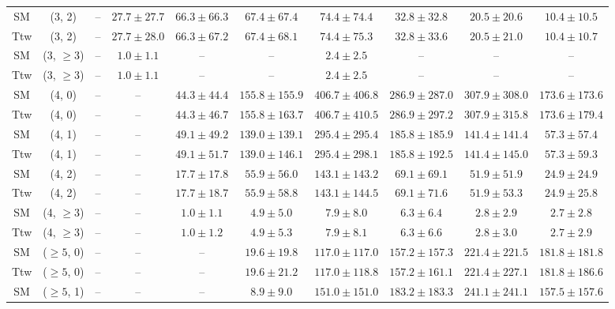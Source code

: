 \begin{table}[h!]
{\begin{tabular}{cccccccccc}
	SM & (3, 2) & -- & $27.7\pm 27.7$ & $66.3\pm 66.3$ & $67.4\pm 67.4$ & $74.4\pm 74.4$ & $32.8\pm 32.8$ & $20.5\pm 20.6$ & $10.4\pm 10.5$ \\[0.5ex] 
	Ttw & (3, 2) & -- & $27.7\pm 28.0$ & $66.3\pm 67.2$ & $67.4\pm 68.1$ & $74.4\pm 75.3$ & $32.8\pm 33.6$ & $20.5\pm 21.0$ & $10.4\pm 10.7$ \\[0.5ex] 
	SM & (3, $\ge3$) & -- & $1.0\pm 1.1$ & -- & -- & $2.4\pm 2.5$ & -- & -- & -- \\[0.5ex] 
	Ttw & (3, $\ge3$) & -- & $1.0\pm 1.1$ & -- & -- & $2.4\pm 2.5$ & -- & -- & -- \\[0.5ex] 
	SM & (4, 0) & -- & -- & $44.3\pm 44.4$ & $155.8\pm 155.9$ & $406.7\pm 406.8$ & $286.9\pm 287.0$ & $307.9\pm 308.0$ & $173.6\pm 173.6$ \\[0.5ex] 
	Ttw & (4, 0) & -- & -- & $44.3\pm 46.7$ & $155.8\pm 163.7$ & $406.7\pm 410.5$ & $286.9\pm 297.2$ & $307.9\pm 315.8$ & $173.6\pm 179.4$ \\[0.5ex] 
	SM & (4, 1) & -- & -- & $49.1\pm 49.2$ & $139.0\pm 139.1$ & $295.4\pm 295.4$ & $185.8\pm 185.9$ & $141.4\pm 141.4$ & $57.3\pm 57.4$ \\[0.5ex] 
	Ttw & (4, 1) & -- & -- & $49.1\pm 51.7$ & $139.0\pm 146.1$ & $295.4\pm 298.1$ & $185.8\pm 192.5$ & $141.4\pm 145.0$ & $57.3\pm 59.3$ \\[0.5ex] 
	SM & (4, 2) & -- & -- & $17.7\pm 17.8$ & $55.9\pm 56.0$ & $143.1\pm 143.2$ & $69.1\pm 69.1$ & $51.9\pm 51.9$ & $24.9\pm 24.9$ \\[0.5ex] 
	Ttw & (4, 2) & -- & -- & $17.7\pm 18.7$ & $55.9\pm 58.8$ & $143.1\pm 144.5$ & $69.1\pm 71.6$ & $51.9\pm 53.3$ & $24.9\pm 25.8$ \\[0.5ex] 
	SM & (4, $\ge3$) & -- & -- & $1.0\pm 1.1$ & $4.9\pm 5.0$ & $7.9\pm 8.0$ & $6.3\pm 6.4$ & $2.8\pm 2.9$ & $2.7\pm 2.8$ \\[0.5ex] 
	Ttw & (4, $\ge3$) & -- & -- & $1.0\pm 1.2$ & $4.9\pm 5.3$ & $7.9\pm 8.1$ & $6.3\pm 6.6$ & $2.8\pm 3.0$ & $2.7\pm 2.9$ \\[0.5ex] 
	SM & ($\ge5$, 0) & -- & -- & -- & $19.6\pm 19.8$ & $117.0\pm 117.0$ & $157.2\pm 157.3$ & $221.4\pm 221.5$ & $181.8\pm 181.8$ \\[0.5ex] 
	Ttw & ($\ge5$, 0) & -- & -- & -- & $19.6\pm 21.2$ & $117.0\pm 118.8$ & $157.2\pm 161.1$ & $221.4\pm 227.1$ & $181.8\pm 186.6$ \\[0.5ex] 
	SM & ($\ge5$, 1) & -- & -- & -- & $8.9\pm 9.0$ & $151.0\pm 151.0$ & $183.2\pm 183.3$ & $241.1\pm 241.1$ & $157.5\pm 157.6$ \\[0.5ex] 

\end{tabular}}
\end{table}
